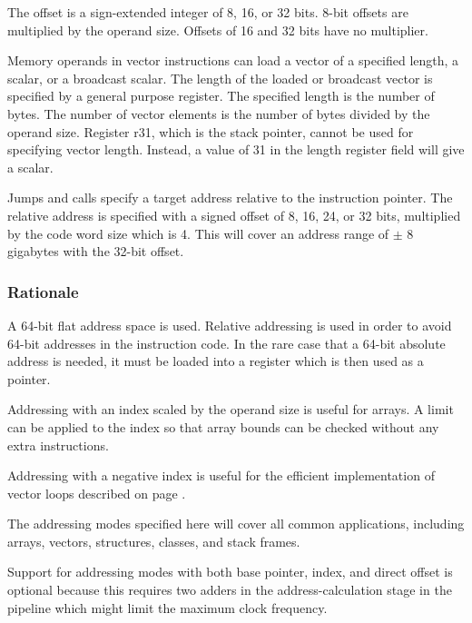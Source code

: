 \documentclass[forwardcom.tex]{subfiles}
\begin{document}
The offset is a sign-extended integer of 8, 16, or 32 bits. 8-bit offsets are multiplied by the operand size. Offsets of 16 and 32 bits have no multiplier.
\vv

Memory operands in vector instructions can load a vector of a specified length, a scalar, or a broadcast scalar. The length of the loaded or broadcast vector is specified by a general purpose register. The specified length is the number of bytes. The number of vector elements is the number of bytes divided by the operand size. Register r31, which is the stack pointer, cannot be used for specifying vector length. Instead, a value of 31 in the length register field will give a scalar.
\vv

Jumps and calls specify a target address relative to the instruction pointer. The relative address is specified with a signed offset of 8, 16, 24, or 32 bits, multiplied by the code word size which is 4. This will cover an address range of
$\pm$ 8 gigabytes with the 32-bit offset.
\vv

\subsubsection{Rationale}
A 64-bit flat address space is used. Relative addressing is used in order to avoid 64-bit addresses in the instruction code. In the rare case that a 64-bit absolute address is needed, it must be loaded into a register which is then used as a pointer.
\vv

Addressing with an index scaled by the operand size is useful for arrays. A limit can be applied to the index so that array bounds can be checked without any extra instructions.
\vv

Addressing with a negative index is useful for the efficient implementation of vector loops described on page \pageref{vectorLoops}.
\vv

The addressing modes specified here will cover all common applications, including arrays, vectors, structures, classes, and stack frames.
\vv

Support for addressing modes with both base pointer, index, and direct offset is optional because this requires two adders in the address-calculation stage in the pipeline which might limit the maximum clock frequency.
\end{document}
